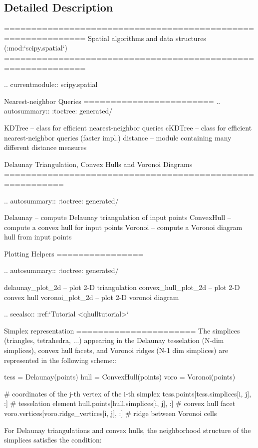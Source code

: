 \subsection{Detailed Description}
\begin{DoxyVerb}=============================================================
Spatial algorithms and data structures (:mod:`scipy.spatial`)
=============================================================

.. currentmodule:: scipy.spatial

Nearest-neighbor Queries
========================
.. autosummary::
   :toctree: generated/

   KDTree      -- class for efficient nearest-neighbor queries
   cKDTree     -- class for efficient nearest-neighbor queries (faster impl.)
   distance    -- module containing many different distance measures

Delaunay Triangulation, Convex Hulls and Voronoi Diagrams
=========================================================

.. autosummary::
   :toctree: generated/

   Delaunay    -- compute Delaunay triangulation of input points
   ConvexHull  -- compute a convex hull for input points
   Voronoi     -- compute a Voronoi diagram hull from input points

Plotting Helpers
================

.. autosummary::
   :toctree: generated/

   delaunay_plot_2d     -- plot 2-D triangulation
   convex_hull_plot_2d  -- plot 2-D convex hull
   voronoi_plot_2d      -- plot 2-D voronoi diagram

.. seealso:: :ref:`Tutorial <qhulltutorial>`


Simplex representation
======================
The simplices (triangles, tetrahedra, ...) appearing in the Delaunay
tesselation (N-dim simplices), convex hull facets, and Voronoi ridges
(N-1 dim simplices) are represented in the following scheme::

    tess = Delaunay(points)
    hull = ConvexHull(points)
    voro = Voronoi(points)

    # coordinates of the j-th vertex of the i-th simplex
    tess.points[tess.simplices[i, j], :]        # tesselation element
    hull.points[hull.simplices[i, j], :]        # convex hull facet
    voro.vertices[voro.ridge_vertices[i, j], :] # ridge between Voronoi cells

For Delaunay triangulations and convex hulls, the neighborhood
structure of the simplices satisfies the condition:


\end{DoxyVerb}
